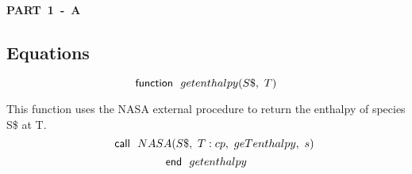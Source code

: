\documentclass[10pt,fleqn]{article}
\newcommand{\F}[1]{\mbox{$#1$}}
\newcommand{\K}[1]{\mbox{\sf#1\ \ \mit}}
\newcommand{\V}[1]{\mbox{$ #1 $}}
\newcommand{\I}{\mbox{\hspace{0.20in}}}
\begin{document}
\begin{center}
\bf \mbox{PART 1 - A}
\vspace{0.2 in}
\end{center}
\subsection*{Equations}
\begin{equation}
\label{EES Eqn:1}
\K{function} \F{getenthalpy}{ \left( S\$,\ T \right) } 
\end{equation}

\vspace{0.04in}
\noindent
\rm This function uses the NASA external procedure to return the enthalpy of species S\$ at T.
\begin{equation}
\I \label{EES Eqn:2}
\K{call} \F{NASA}{ \left( S\$,\ T:\V{cp} ,\ \V{geTenthalpy} ,\ s \right) } 
\end{equation}
\begin{equation}
\label{EES Eqn:3}
\K{end} \V{getenthalpy}  
\end{equation}
\end{document}
